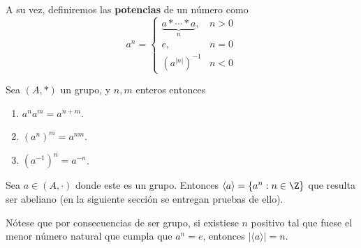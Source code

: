 \documentclass[11pt,oneside]{book}
\begin{document}
A su vez, definiremos las \textbf{potencias} de un número como
$$a^n=\begin{cases}
\underbrace{a*\cdots*a}_n,&n\gt 0\\
e,&n=0\\
(a^{|n|})^{-1}&n\lt 0
\end{cases}$$
\begin{thm}
Sea $(A,*)$ un grupo, y $n,m$ enteros entonces
\begin{enumerate}
\item $a^na^m=a^{n+m}$.
\item $(a^n)^m=a^{nm}$.
\item $(a^{-1})^n=a^{-n}$.
\end{enumerate}
\end{thm}
\begin{thm}
Sea $a\in(A,\cdot)$ donde este es un grupo. Entonces $\langle a\rangle=\{a^n:n\in\Z\}$ que resulta ser abeliano (en la siguiente sección se entregan pruebas de ello).
\end{thm}
Nótese que por consecuencias de ser grupo, si existiese $n$ positivo tal que fuese el menor número natural que cumpla que $a^n=e$, entonces $|\langle a\rangle|=n$.
\end{document}

